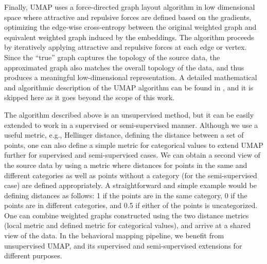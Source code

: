 Finally, UMAP uses a force-directed graph layout algorithm in low dimensional space where attractive and repulsive forces are defined based on the gradients, optimizing the edge-wise cross-entropy between the original weighted graph and equivalent weighted graph induced by the embeddings.
The algorithm proceeds by iteratively applying attractive and repulsive forces at each edge or vertex.
Since the ``true'' graph captures the topology of the source data, the approximated graph also matches the overall topology of the data, and thus produces a meaningful low-dimensional representation.
A detailed mathematical and algorithmic description of the UMAP algorithm can be found in \citep{mcinnes_umap_2020}, and it is skipped here as it goes beyond the scope of this work.

The algorithm described above is an unsupervised method, but it can be easily extended to work in a supervised or semi-supervised manner.
Although we use a useful metric, e.g., Hellinger distance, defining the distance between a set of points, one can also define a simple metric for categorical values to extend UMAP further for supervised and semi-supervised cases.
We can obtain a second view of the source data by using a metric where distances for points in the same  and different categories as well as points without a category (for the semi-supervised case) are defined appropriately.
A straightforward and simple example would be defining distances as follows: 1 if the points are in the same category, 0 if the points are in different categories, and 0.5 if either of the points is uncategorized.
One can combine weighted graphs constructed using the two distance metrics (local metric and defined metric for categorical values), and arrive at a shared view of the data.
In the behavioral mapping pipeline, we benefit from unsupervised UMAP, and its supervised and semi-supervised extensions for different purposes.

